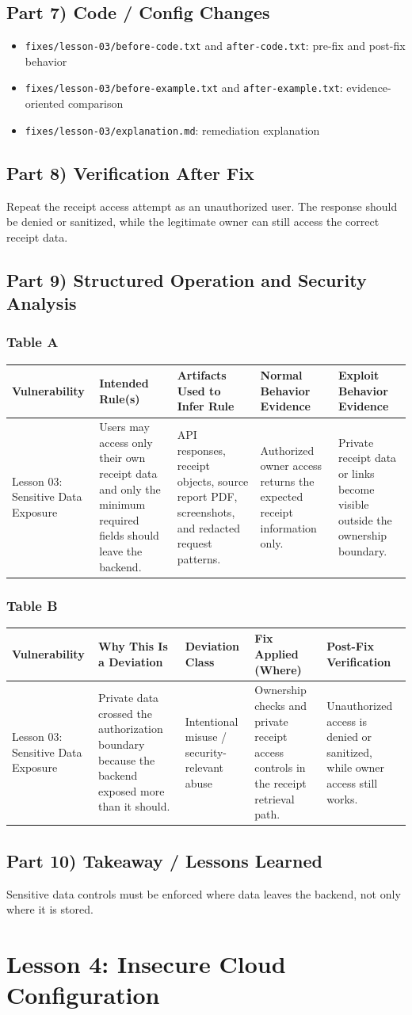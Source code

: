 \documentclass[12pt]{article}
\makeatletter
\newcommand{\analysistables}[9]{
\subsubsection*{Table A}
{\footnotesize
\begin{longtable}{@{}p{0.13\textwidth}p{0.18\textwidth}p{0.17\textwidth}p{0.16\textwidth}p{0.16\textwidth}@{}}
\toprule
Vulnerability & Intended Rule(s) & Artifacts Used to Infer Rule & Normal Behavior Evidence & Exploit Behavior Evidence \\
\midrule
#1 & #2 & #3 & #4 & #5 \\
\bottomrule
\end{longtable}
}

\subsubsection*{Table B}
{\footnotesize
\begin{longtable}{@{}p{0.13\textwidth}p{0.18\textwidth}p{0.13\textwidth}p{0.18\textwidth}p{0.16\textwidth}@{}}
\toprule
Vulnerability & Why This Is a Deviation & Deviation Class & Fix Applied (Where) & Post-Fix Verification \\
\midrule
#1 & #6 & #7 & #8 & #9 \\
\bottomrule
\end{longtable}
}
}
\makeatother
\begin{document}
\subsection*{Part 7) Code / Config Changes}
\begin{itemize}
\item \texttt{fixes/lesson-03/before-code.txt} and \texttt{after-code.txt}: pre-fix and post-fix behavior
\item \texttt{fixes/lesson-03/before-example.txt} and \texttt{after-example.txt}: evidence-oriented comparison
\item \texttt{fixes/lesson-03/explanation.md}: remediation explanation
\end{itemize}

\subsection*{Part 8) Verification After Fix}
Repeat the receipt access attempt as an unauthorized user. The response should be denied or sanitized, while the legitimate owner can still access the correct receipt data.

\subsection*{Part 9) Structured Operation and Security Analysis}
\analysistables
{Lesson 03: Sensitive Data Exposure}
{Users may access only their own receipt data and only the minimum required fields should leave the backend.}
{API responses, receipt objects, source report PDF, screenshots, and redacted request patterns.}
{Authorized owner access returns the expected receipt information only.}
{Private receipt data or links become visible outside the ownership boundary.}
{Private data crossed the authorization boundary because the backend exposed more than it should.}
{Intentional misuse / security-relevant abuse}
{Ownership checks and private receipt access controls in the receipt retrieval path.}
{Unauthorized access is denied or sanitized, while owner access still works.}

\subsection*{Part 10) Takeaway / Lessons Learned}
Sensitive data controls must be enforced where data leaves the backend, not only where it is stored.

\clearpage
\section{Lesson 4: Insecure Cloud Configuration}
\end{document}
